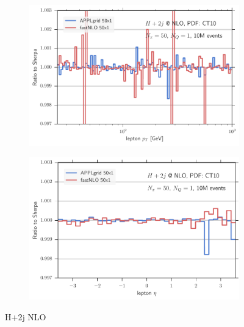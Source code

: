 \begin{figure}
\begin{subfigure}[]{0.49\textwidth}
	\includegraphics[width=\textwidth]{images/hjjnlo_lpt_50v30.pdf}
\end{subfigure}
\hfill
\begin{subfigure}[]{0.49\textwidth}
	\includegraphics[width=\textwidth]{images/hjjnlo_leta_50v30.pdf}
\end{subfigure}
\caption{H+2j NLO}
\label{fig:hjjnlo_validation}
\end{figure}
%




